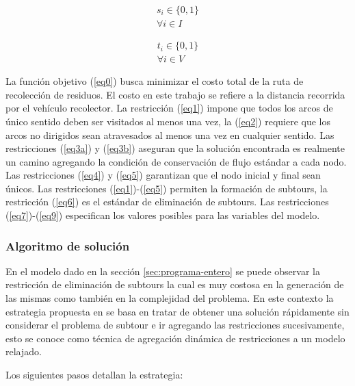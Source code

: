 \documentclass[conference]{IEEEtran}
\begin{document}
\begin{equation} \tag{8} \label{eq8}
\begin{gathered}
    s_i \in \{0,1\} \\
    \forall i \in I
\end{gathered}
\end{equation}
\hbox{}

\begin{equation} \tag{9} \label{eq9}
\begin{gathered}
    t_i \in \{0,1\} \\
    \forall i \in V
\end{gathered}
\end{equation}

La función objetivo (\ref{eq0}) busca minimizar el costo total de la ruta de recolección de residuos. El costo en este trabajo se refiere a la distancia recorrida por el vehículo recolector. La restricción (\ref{eq1}) impone que todos los arcos de único sentido deben ser visitados al menos una vez, la (\ref{eq2}) requiere que los arcos no dirigidos sean atravesados al menos una vez en cualquier sentido. Las restricciones (\ref{eq3a}) y (\ref{eq3b}) aseguran que la solución encontrada es realmente un camino agregando la condición de conservación de flujo estándar a cada nodo. Las restricciones (\ref{eq4}) y (\ref{eq5}) garantizan que el nodo inicial y final sean únicos. Las restricciones (\ref{eq1})-(\ref{eq5}) permiten la formación de subtours, la restricción (\ref{eq6}) es el estándar de eliminación de subtours. Las restricciones (\ref{eq7})-(\ref{eq9}) especifican los valores posibles para las variables del modelo.

\subsubsection{Algoritmo de solución}
\label{algoritmo-solucion}
En el modelo dado en la sección \ref{sec:programa-entero} se puede observar la restricción de eliminación de subtours la cual es muy costosa en la generación de las mismas como también en  la complejidad del problema. En este contexto la estrategia propuesta en \cite{Braier2017AnArgentina} se basa en tratar de obtener una solución rápidamente sin considerar el problema de subtour e ir agregando las restricciones sucesivamente, esto se conoce como técnica de agregación dinámica de restricciones a un modelo relajado.

Los siguientes pasos detallan la estrategia:
\end{document}
